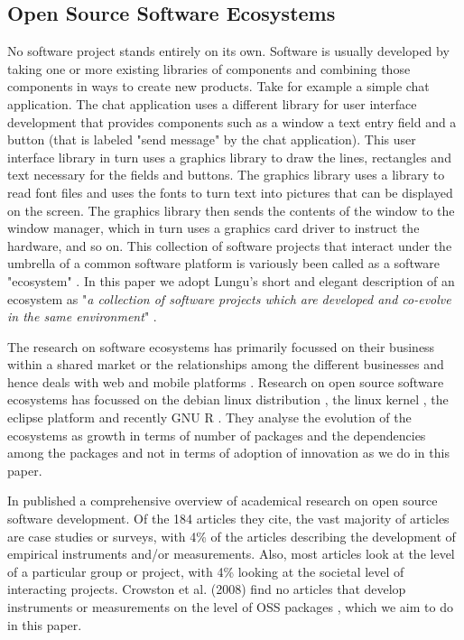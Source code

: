 \documentclass[smallextended,final]{svjour3}
\begin{document}
\subsection{ Open Source Software Ecosystems}
No software project stands entirely on its own. Software is usually developed by taking one or more existing libraries of components and combining those components in ways to create new products. Take for example a simple chat application. The chat application uses a different library for user interface development that provides components such as a window a text entry field and a button (that is labeled "send message" by the chat application). This user interface library in turn uses a graphics library to draw the lines, rectangles and text necessary for the fields and buttons. The graphics library uses a library to read font files and uses the fonts to turn text into pictures that can be displayed on the screen. The graphics library then sends the contents of the window to the window manager, which in turn uses a graphics card driver to instruct the hardware, and so on.  This collection of software projects that interact under the umbrella of a common software platform is variously been called as a software "ecosystem" \citep{manikas13}. In this paper we adopt Lungu's short and elegant description of an ecosystem as "\textit{a collection of software projects which are developed and co-evolve in the same environment}" \citep{lungu10}.

The research on software ecosystems has primarily focussed on their business within a shared market or the relationships among the different businesses and hence deals with web and mobile platforms \citep{german13}.  Research on open source software ecosystems has focussed on the debian linux distribution \citep{gonzalez09, german07}, the linux kernel \citep{godfrey00}, the eclipse platform \citep{wermelinger08} and recently GNU R \citep{german13}. They analyse the evolution of the ecosystems as growth in terms of number of packages and the dependencies among the packages and not in terms of adoption of innovation as we do in this paper.

In \citet{crowston08} published a comprehensive overview of academical research on open source software development. Of the 184 articles they cite, the vast majority of articles are case studies or surveys, with 4\% of the articles describing the development of empirical instruments and/or measurements. Also, most articles look at the level of a particular group or project, with 4\% looking at the societal level of interacting projects. Crowston et al. (2008) find no articles that develop instruments or measurements on the level of OSS packages \citep{crowston08}, which we aim to do in this paper.
\end{document}
